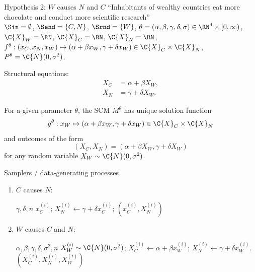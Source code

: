 \begin{frame}{Hypothesis 2: $W$ causes $N$ and $C$}
  ``Inhabitants of wealthy countries eat more chocolate and conduct more scientific research''\\

  $\Sin = \emptyset$, $\Send = \{C,N\}$, $\Srnd = \{W\}$, $\theta = (\alpha,\beta,\gamma,\delta,\sigma) \in \RN^4 \times [0,\infty)$, $\C{X}_W = \RN$, $\C{X}_C = \RN$, $\C{X}_N = \RN$, $f^{\theta} : (x_C,x_N,x_W) \mapsto (\alpha + \beta x_W, \gamma + \delta x_W) \in \C{X}_C \times \C{X}_N$, $P^{\theta} = \C{N}(0,\sigma^2)$.

  Structural equations:
    \begin{align*}
      X_C & = \alpha + \beta X_W, \\
      X_N & = \gamma + \delta X_W.
    \end{align*}
  
  For a given parameter $\theta$, the SCM $M^{\theta}$ has unique solution function 
  $$g^\theta : x_W \mapsto (\alpha + \beta x_W, \gamma + \delta x_W) \in \C{X}_C \times \C{X}_N$$
  and outcomes of the form
  $$(X_C,X_N) = (\alpha + \beta X_W, \gamma + \delta X_W)$$ 
  for any random variable $X_W \sim \C{N}(0,\sigma^2)$.
\end{frame}

\begin{frame}{Samplers / data-generating processes}
  \begin{enumerate}
    \item[H1] $C$ causes $N$:\\
      \begin{algorithmic}[1]
        \Input $\gamma,\delta,n$
          \Input $x_C^{(i)}$;
          \State $X_N^{(i)} \leftarrow \gamma + \delta x_C^{(i)}$;
          \Output $(x_C^{(i)},X_N^{(i)})$
        \EndFor
      \end{algorithmic}
    \item[H2] $W$ causes $C$ and $N$:\\
      \begin{algorithmic}[1]
        \Input $\alpha,\beta,\gamma,\delta,\sigma^2,n$
          \Sample $X_W^{(i)} \sim \C{N}(0,\sigma^2)$;
          \State $X_C^{(i)} \leftarrow \alpha + \beta x_W^{(i)}$;
          \State $X_N^{(i)} \leftarrow \gamma + \delta x_W^{(i)}$.
          \Output $(X_C^{(i)},X_N^{(i)},X_W^{(i)})$
        \EndFor
      \end{algorithmic}
  \end{enumerate}
\end{frame}

